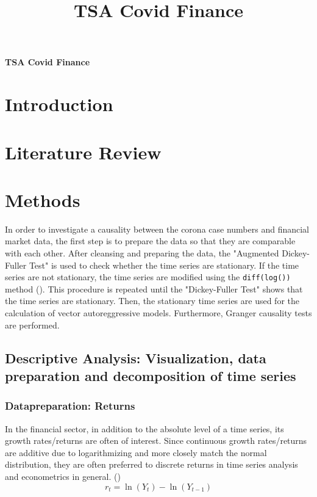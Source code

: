 \documentclass[11pt]{article}
\title{TSA Covid Finance}
\begin{document}
\begin{center}
\textbf{\Large TSA Covid Finance}    
\end{center}


\section{Introduction}
\section{Literature Review}
\section{Methods}
In order to investigate a causality between the corona case numbers and financial market data, the first step is to prepare the data so that they are comparable with each other. After cleansing and preparing the data, the "Augmented Dickey-Fuller Test" is used to check whether the time series are stationary. If the time series are not stationary, the time series are modified using the \lstinline{diff(log())} method (). This procedure is repeated until the "Dickey-Fuller Test" shows that the time series are stationary. Then, the stationary time series are used for the calculation of vector autoreggressive models. Furthermore, Granger causality tests are performed.

\subsection{Descriptive Analysis: Visualization, data preparation and decomposition of time series}
\subsubsection{Datapreparation: Returns}
In the financial sector, in addition to the absolute level of a time series, its growth rates/returns are often of interest.
Since continuous growth rates/returns are additive due to logarithmizing and more closely match the normal distribution, they are often preferred to discrete returns in time series analysis and econometrics in general. (\cite{PowerPoi49:online})
$$r_{t} =\ln \left(Y_{t}\right)-\ln \left(Y_{t-1}\right)$$
\end{document}
